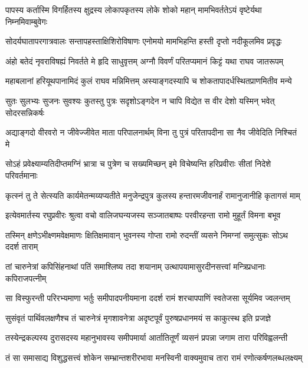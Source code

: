 \twolineshloka
{पापस्य कर्तास्मि विगर्हितस्य क्षुद्रस्य लोकापकृतस्य लोके}
{शोको महान् मामभिवर्ततेऽयं वृष्टेर्यथा निम्नमिवाम्बुवेगः} %

\twolineshloka
{सोदर्यघातापरगात्रवालः सन्तापहस्ताक्षिशिरोविषाणः}
{एनोमयो मामभिहन्ति हस्ती दृप्तो नदीकूलमिव प्रवृद्धः} %

\twolineshloka
{अंहो बतेदं नृवराविषह्यं निवर्तते मे हृदि साधुवृत्तम्}
{अग्नौ विवर्णं परितप्यमानं किट्टं यथा राघव जातरूपम्} %

\twolineshloka
{महाबलानां हरियूथपानामिदं कुलं राघव मन्निमित्तम्}
{अस्याङ्गदस्यापि च शोकतापादर्धस्थितप्राणमितीव मन्ये} %

\twolineshloka
{सुतः सुलभ्यः सुजनः सुवश्यः कुतस्तु पुत्रः सदृशोऽङ्गदेन}
{न चापि विद्येत स वीर देशो यस्मिन् भवेत् सोदरसन्निकर्षः} %

\twolineshloka
{अद्याङ्गदो वीरवरो न जीवेज्जीवेत माता परिपालनार्थम्}
{विना तु पुत्रं परितापदीना सा नैव जीवेदिति निश्चितं मे} %

\twolineshloka
{सोऽहं प्रवेक्ष्याम्यतिदीप्तमग्निं भ्रात्रा च पुत्रेण च सख्यमिच्छन्}
{इमे विचेष्यन्ति हरिप्रवीराः सीतां निदेशे परिवर्तमानाः} %

\twolineshloka
{कृत्स्नं तु ते सेत्स्यति कार्यमेतन्मय्यप्यतीते मनुजेन्द्रपुत्र}
{कुलस्य हन्तारमजीवनार्हं रामानुजानीहि कृतागसं माम्} %

\twolineshloka
{इत्येवमार्तस्य रघुप्रवीरः श्रुत्वा वचो वालिजघन्यजस्य}
{सञ्जातबाष्पः परवीरहन्ता रामो मुहूर्तं विमना बभूव} %

\twolineshloka
{तस्मिन् क्षणेऽभीक्ष्णमवेक्षमाणः क्षितिक्षमावान् भुवनस्य गोप्ता}
{रामो रुदन्तीं व्यसने निमग्नां समुत्सुकः सोऽथ ददर्श ताराम्} %

\twolineshloka
{तां चारुनेत्रां कपिसिंहनाथां पतिं समाश्लिष्य तदा शयानाम्}
{उत्थापयामासुरदीनसत्त्वां मन्त्रिप्रधानाः कपिराजपत्नीम्} %

\twolineshloka
{सा विस्फुरन्ती परिरभ्यमाणा भर्तुः समीपादपनीयमाना}
{ददर्श रामं शरचापपाणिं स्वतेजसा सूर्यमिव ज्वलन्तम्} %

\twolineshloka
{सुसंवृतं पार्थिवलक्षणैश्च तं चारुनेत्रं मृगशावनेत्रा}
{अदृष्टपूर्वं पुरुषप्रधानमयं स काकुत्स्थ इति प्रजज्ञे} %

\twolineshloka
{तस्येन्द्रकल्पस्य दुरासदस्य महानुभावस्य समीपमार्या}
{आर्तातितूर्णं व्यसनं प्रपन्ना जगाम तारा परिविह्वलन्ती} %

\twolineshloka
{तं सा समासाद्य विशुद्धसत्त्वं शोकेन सम्भ्रान्तशरीरभावा}
{मनस्विनी वाक्यमुवाच तारा रामं रणोत्कर्षणलब्धलक्ष्यम्} %

